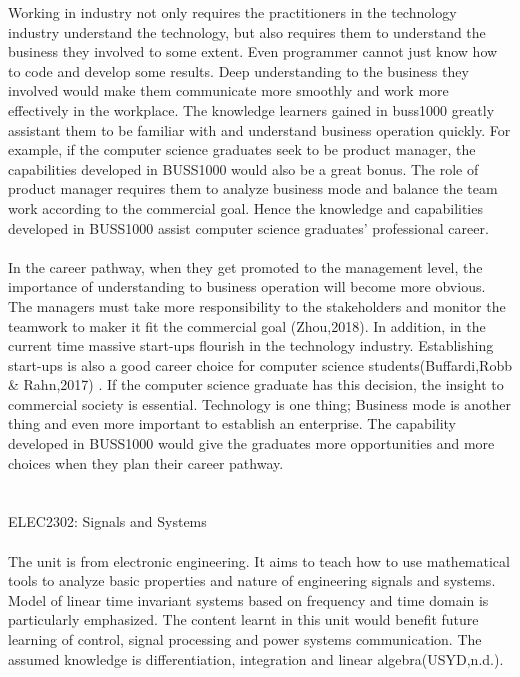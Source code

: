\documentclass{article}
\begin{document}
	Working in industry not only requires the practitioners in the technology industry understand the technology, but also requires them to understand the business they involved to some extent. Even programmer cannot just know how to code and develop some results. Deep understanding to the business they involved would make them communicate more smoothly and work more effectively in the workplace. The knowledge learners gained in buss1000 greatly assistant them to be familiar with and understand business operation quickly. For example, if the computer science graduates seek to be product manager, the capabilities developed in BUSS1000 would also be a great bonus. The role of product manager requires them to analyze business mode and balance the team work according to the commercial goal. Hence the knowledge and capabilities developed in BUSS1000 assist computer science graduates’ professional career.\\
	\\
	In the career pathway, when they get promoted to the management level, the importance of understanding to business operation will become more obvious. The managers must take more responsibility to the stakeholders and monitor the teamwork to maker it fit the commercial goal (Zhou,2018). In addition, in the current time massive start-ups flourish in the technology industry. Establishing start-ups is also a good career choice for computer science students(Buffardi,Robb & Rahn,2017) . If the computer science graduate has this decision, the insight to commercial society is essential. Technology is one thing; Business mode is another thing and even more important to establish an enterprise. The capability developed in BUSS1000 would give the graduates more opportunities and more choices when they plan their career pathway.\\
	\\
	\\
	ELEC2302: Signals and Systems\\
	\\
	The unit is from electronic engineering. It aims to teach how to use mathematical tools to analyze basic properties and nature of engineering signals and systems. Model of linear time invariant systems based on frequency and time domain is particularly emphasized. The content learnt in this unit would benefit future learning of control, signal processing and power systems communication. The assumed knowledge is differentiation, integration and linear algebra(USYD,n.d.).\\
	\\
\end{document}
